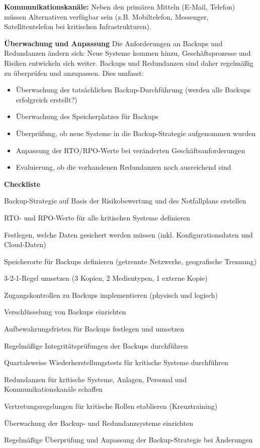 \textbf{Kommunikationskanäle:} Neben den primären Mitteln (E-Mail, Telefon) müssen Alternativen verfügbar sein (z.B. Mobiltelefon, Messenger, Satellitentelefon bei kritischen Infrastrukturen).

\textbf{Überwachung und Anpassung}
Die Anforderungen an Backups und Redundanzen ändern sich: Neue Systeme kommen hinzu, Geschäftsprozesse und Risiken entwickeln sich weiter. Backups und Redundanzen sind daher regelmäßig zu überprüfen und anzupassen. Dies umfasst:

\begin{itemize}
    \item Überwachung der tatsächlichen Backup-Durchführung (werden alle Backups erfolgreich erstellt?)
    \item Überwachung des Speicherplatzes für Backups
    \item Überprüfung, ob neue Systeme in die Backup-Strategie aufgenommen wurden
    \item Anpassung der RTO/RPO-Werte bei veränderten Geschäftsanforderungen
    \item Evaluierung, ob die vorhandenen Redundanzen noch ausreichend sind
\end{itemize}
\newpage
\textbf{Checkliste}
\begin{checklist}
    \item Backup-Strategie auf Basis der Risikobewertung und des Notfallplans erstellen
    \item RTO- und RPO-Werte für alle kritischen Systeme definieren
    \item Festlegen, welche Daten gesichert werden müssen (inkl. Konfigurationsdaten und Cloud-Daten)
    \item Speicherorte für Backups definieren (getrennte Netzwerke, geografische Trennung)
    \item 3-2-1-Regel umsetzen (3 Kopien, 2 Medientypen, 1 externe Kopie)
    \item Zugangskontrollen zu Backups implementieren (physisch und logisch)
    \item Verschlüsselung von Backups einrichten
    \item Aufbewahrungsfristen für Backups festlegen und umsetzen
    \item Regelmäßige Integritätsprüfungen der Backups durchführen
    \item Quartalsweise Wiederherstellungstests für kritische Systeme durchführen
    \item Redundanzen für kritische Systeme, Anlagen, Personal und Kommunikationskanäle schaffen
    \item Vertretungsregelungen für kritische Rollen etablieren (Kreuztraining)
    \item Überwachung der Backup- und Redundanzsysteme einrichten
    \item Regelmäßige Überprüfung und Anpassung der Backup-Strategie bei Änderungen
\end{checklist}

